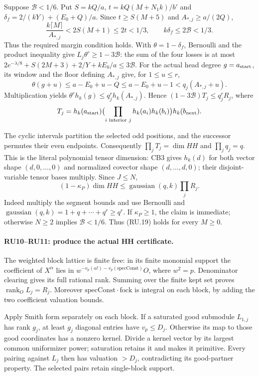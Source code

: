 \documentclass[11pt,a4paper]{article}
\numberwithin{equation}{section}
\theoremstyle{remark}\newtheorem{remark}[theorem]{Remark}
\begin{document}
Suppose $\mathcal B<1/6$. Put
$S=kQ/a$, $t=kQ(M+N_1k)/b'$ and
$\delta_f=2/(kY)+(E_0+Q)/a$.
Since $t\ge S(M+5)$ and $A_{*,j}\ge a/(2Q)$,
\[
 \frac{k\lceil M\rceil}{A_{*,j}}<2S(M+1)\le2t<1/3,
 \qquad k\delta_f\le2\mathcal B<1/3.                       \tag{RU.18}
\]
Thus the required margin condition holds. With
$\theta=1-\delta_f$, Bernoulli and the product inequality give
$L_j\theta^r\ge1-3\mathcal B$: the sum of the four losses is at
most
$2e^{-\lambda/8}+S(2M+3)+2/Y+kE_0/a\le3\mathcal B$.
For the actual head degree $g=a_{\rm start}$, its window and the
floor defining $A_{*,j}$ give, for $1\le u\le r$,
\[
 \theta(g+u)\le a-E_0+u-Q\le a-E_0+u-1
                  <q_j(A_{*,j}+u).
\]
Multiplication yields
$\theta^r h_k(g)\le q_j^rh_k(A_{*,j})$.
Hence $(1-3\mathcal B)T_j\le q_j^rR_j$, where
\[
 T_j=h_k(a_{\rm start})\bigl(\prod_{i\text{ interior }j}
                 h_k(a_i)h_k(b_i)\bigr)h_k(b_{\rm next}).
\]

The cyclic intervals partition the selected odd positions, and
the successor permutes their even endpoints. Consequently
$\prod_jT_j=\dim HH$ and $\prod_jq_j=q$.
This is the literal polynomial tensor dimension: CB3 gives
$h_k(d)$ for both vector shape $(d,0,\ldots,0)$ and normalized
covector shape $(d,\ldots,d,0)$; their disjoint-variable tensor
bases multiply. Since $J\le N$,
\[
 \boxed{(1-\kappa_P)\dim HH
       \le\operatorname{gaussian}(q,k)\prod_jR_j.}         \tag{RU.19}
\]
Indeed multiply the segment bounds and use Bernoulli and
$\operatorname{gaussian}(q,k)=1+q+\cdots+q^r\ge q^r$.
If $\kappa_P\ge1$, the claim is immediate; otherwise $N\ge2$
implies $\mathcal B<1/6$. Thus (RU.19) holds for every $M\ge0$.

\paragraph{RU10--RU11: produce the actual HH certificate.}
The weighted block lattice is finite free: in its finite monomial
support the coefficient of $X^\alpha$ lies in
$w^{-v_p(\alpha!)-v_p(\mathrm{specConst})}O$, where $w^2=p$.
Denominator clearing gives its full rational rank. Summing over
the finite kept set proves $\operatorname{rank}_O L_j=R_j$.
Moreover $\mathrm{specConst}\cdot\mathrm{fock}$ is integral on
each block, by adding the two coefficient valuation bounds.

Apply Smith form separately on each block. If a saturated good
submodule $L_{1,j}$ has rank $g_j$, at least $g_j$ diagonal
entries have $v_p\le D_j$. Otherwise its map to those good
coordinates has a nonzero kernel. Divide a kernel vector by its
largest common uniformizer power; saturation retains it and makes
it primitive. Every pairing against $L_j$ then has valuation
$>D_j$, contradicting its good-partner property. The selected
pairs retain single-block support.
\end{document}

